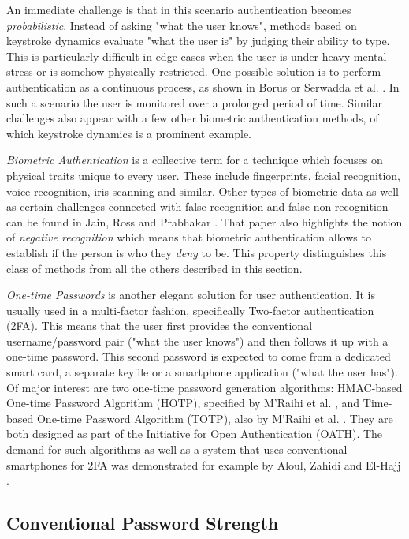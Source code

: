 An immediate challenge is that in this scenario authentication becomes \emph{probabilistic}. Instead of asking "what the user knows", methods based on keystroke dynamics evaluate "what the user is" by judging their ability to type. This is particularly difficult in edge cases when the user is under heavy mental stress or is somehow physically restricted. One possible solution is to perform authentication as a continuous process, as shown in Borus \cite{bours2012continuous} or Serwadda et al. \cite{serwadda2013scan}. In such a scenario the user is monitored over a prolonged period of time. Similar challenges also appear with a few other biometric authentication methods, of which keystroke dynamics is a prominent example.

\emph{Biometric Authentication} is a collective term for a technique which focuses on physical traits unique to every user. These include fingerprints, facial recognition, voice recognition, iris scanning and similar. Other types of biometric data as well as certain challenges connected with false recognition and false non-recognition can be found in Jain, Ross and Prabhakar \cite{jain:2004:intro-to-biometric}. That paper also highlights the notion of \emph{negative recognition} which means that biometric authentication allows to establish if the person is who they \emph{deny} to be. This property distinguishes this class of methods from all the others described in this section.

\emph{One-time Passwords} is another elegant solution for user authentication. It is usually used in a multi-factor fashion, specifically Two-factor authentication (2FA). This means that the user first provides the conventional username/password pair ("what the user knows") and then follows it up with a one-time password. This second password is expected to come from a dedicated smart card, a separate keyfile or a smartphone application ("what the user has"). Of major interest are two one-time password generation algorithms: HMAC-based One-time Password Algorithm (HOTP), specified by M’Raihi et al. \cite{rfc4226}, and Time-based One-time Password Algorithm (TOTP), also by M’Raihi et al. \cite{rfc6238}. They are both designed as part of the Initiative for Open Authentication (OATH). The demand for such algorithms as well as a system that uses conventional smartphones for 2FA was demonstrated for example by
Aloul, Zahidi and El-Hajj \cite{aloul:2009:two-factor-auth}.

\subsection{Conventional Password Strength}
\label{subsec:password-strength}

